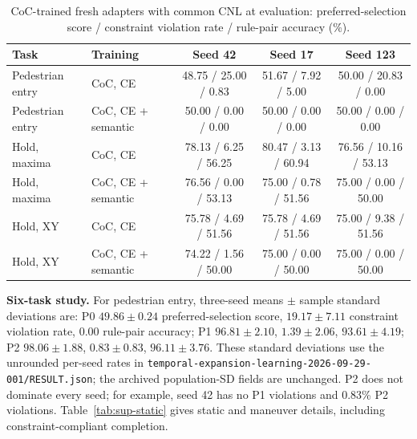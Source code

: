 \documentclass[10pt]{article}
\begin{document}
\begin{table}[h]
\centering\footnotesize
\caption{CoC-trained fresh adapters with common CNL at evaluation: preferred-selection score / constraint violation rate / rule-pair accuracy (\%).}
\label{tab:sup-fresh-common}
\begin{tabular}{llccc}
\toprule
Task & Training & Seed 42 & Seed 17 & Seed 123\\
\midrule
Pedestrian entry & CoC, CE & 48.75 / 25.00 / 0.83 & 51.67 / 7.92 / 5.00 & 50.00 / 20.83 / 0.00\\
Pedestrian entry & CoC, CE + semantic & 50.00 / 0.00 / 0.00 & 50.00 / 0.00 / 0.00 & 50.00 / 0.00 / 0.00\\
Hold, maxima & CoC, CE & 78.13 / 6.25 / 56.25 & 80.47 / 3.13 / 60.94 & 76.56 / 10.16 / 53.13\\
Hold, maxima & CoC, CE + semantic & 76.56 / 0.00 / 53.13 & 75.00 / 0.78 / 51.56 & 75.00 / 0.00 / 50.00\\
Hold, XY & CoC, CE & 75.78 / 4.69 / 51.56 & 75.78 / 4.69 / 51.56 & 75.00 / 9.38 / 51.56\\
Hold, XY & CoC, CE + semantic & 74.22 / 1.56 / 50.00 & 75.00 / 0.00 / 50.00 & 75.00 / 0.00 / 50.00\\
\bottomrule
\end{tabular}
\end{table}

\textbf{Six-task study.} For pedestrian entry, three-seed means $\pm$ sample
standard deviations are: P0 $49.86\pm0.24$ preferred-selection score,
$19.17\pm7.11$ constraint violation rate, $0.00$ rule-pair accuracy;
P1 $96.81\pm2.10$, $1.39\pm2.06$, $93.61\pm4.19$;
P2 $98.06\pm1.88$, $0.83\pm0.83$, $96.11\pm3.76$.
These standard deviations use the unrounded per-seed rates in
\texttt{temporal-expansion-learning-2026-09-29-001/RESULT.json};
the archived population-SD fields are unchanged.
P2 does not dominate every
seed; for example, seed 42 has no P1 violations and 0.83\% P2 violations.
Table~\ref{tab:sup-static} gives static and maneuver details, including
constraint-compliant completion.
\end{document}
